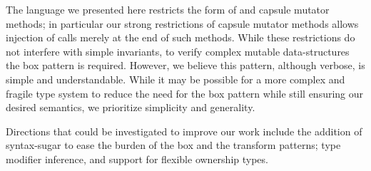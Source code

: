 


The language we presented here restricts the form of \validate{} and capsule mutator methods; in particular
our strong restrictions of capsule mutator methods
allows injection of \validate{} calls merely at the end of such methods.
While these restrictions do not interfere with simple
invariants, to verify complex mutable data-structures the box pattern is required.
However, we believe this pattern, although verbose, is simple and understandable. While it may be possible for a more
complex and fragile type system to reduce the need for the box pattern
 while still ensuring our desired semantics, we prioritize simplicity and generality.


Directions that could be investigated to improve our work include the addition of syntax-sugar to ease the burden of the box and the transform patterns; type modifier inference, and support for flexible ownership types.

